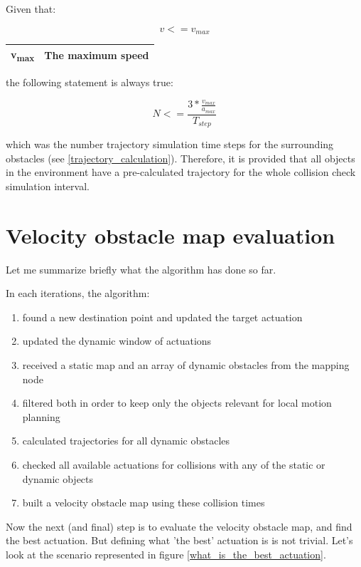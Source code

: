 Given that:

\[ v <= v_{max} \]

\begin{center}
    \begin{tabular}{ | c | c | }
        \hline
        v\textsubscript{max}	& The maximum speed		\\
        \hline
    \end{tabular}
\end{center}

the following statement is always true:

\[ N <= \frac{3 * \frac{v_{max}}{a_{max}}}{T_{step}} \]

which was the number trajectory simulation time steps for the surrounding obstacles (see \ref{trajectory_calculation}). Therefore, it is provided that all objects in the environment have a pre-calculated trajectory for the whole collision check simulation interval.

\section{Velocity obstacle map evaluation}
\label{chap:velocity_obstacle_map_evaluation}
Let me summarize briefly what the algorithm has done so far.

In each iterations, the algorithm:
\begin{enumerate}
  \item found a new destination point and updated the target actuation
  \item updated the dynamic window of actuations
  \item received a static map and an array of dynamic obstacles from the mapping node
  \item filtered both in order to keep only the objects relevant for local motion planning
  \item calculated trajectories for all dynamic obstacles
  \item checked all available actuations for collisions with any of the static or dynamic objects
  \item built a velocity obstacle map using these collision times
\end{enumerate}

Now the next (and final) step is to evaluate the velocity obstacle map, and find the best actuation. But defining what 'the best' actuation is is not trivial.
Let's look at the scenario represented in figure \ref{what_is_the_best_actuation}.

